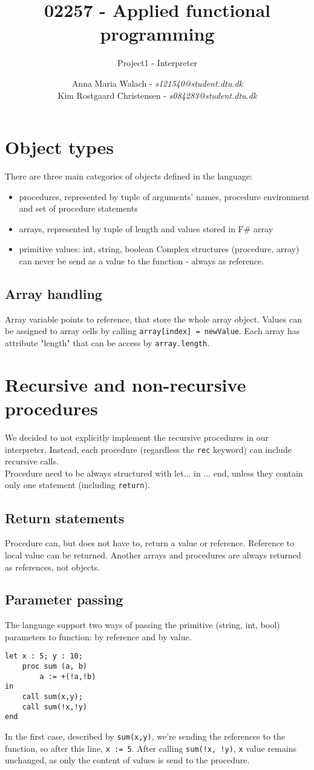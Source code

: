 \documentclass[10pt]{scrartcl}
\title{02257 - Applied functional programming}
\subtitle{Project1 - Interpreter}
\author{Anna Maria Walach - \textit {s121540@student.dtu.dk} \\ Kim Rostgaard Christensen - \textit {s084283@student.dtu.dk}}
\begin{document}
\maketitle
\section{Object types}
There are three main categories of objects defined in the language:
\begin{itemize}
\item procedures, represented by tuple of arguments' names, procedure environment and set of procedure statements
\item arrays, represented by tuple of length and values stored in F\# array
\item primitive values: int, string, boolean
Complex structures (procedure, array) can never be send as a value to the function - always as reference. 
\end{itemize}
\subsection{Array handling}
Array variable points to reference, that store the whole array object. Values can be assigned to array cells by calling \texttt{array[index] = newValue}. Each array has attribute "length" that can be access by \texttt{array.length}.
\section{Recursive and non-recursive procedures}
We decided to not explicitly implement the recursive procedures in our interpreter. Instead, each procedure (regardless the \texttt{rec} keyword) can include recursive calls. \\
Procedure need to be always structured with let... in ... end, unless they contain only one statement (including \texttt{return}).
\subsection{Return statements}
Procedure can, but does not have to, return a value or reference. Reference to local value can be returned. Another arrays and procedures are always returned as references, not objects. 
\subsection{Parameter passing}
The language support two ways of passing the primitive (string, int, bool) parameters to function: by reference and by value. 
\begin{lstlisting}
let x : 5; y : 10;
	proc sum (a, b)
		a := +(!a,!b)
in
	call sum(x,y);
	call sum(!x,!y)
end
\end{lstlisting}
In the first case, described by \texttt{sum(x,y)}, we're sending the references to the function, so after this line, \texttt{x := 5}. After calling \texttt{sum(!x, !y)}, \texttt{x} value remains unchanged, as only the content of values is send to the procedure.
\end{document}
